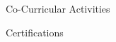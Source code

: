 \documentclass{resume} %
\begin{document}
    \begin{rSection}{Co-Curricular Activities}
        \begin{itemize}
        \end{itemize}


    \end{rSection}

    \begin{rSection}{Certifications}
        \begin{itemize}
        \end{itemize}


    \end{rSection}

\end{document}
